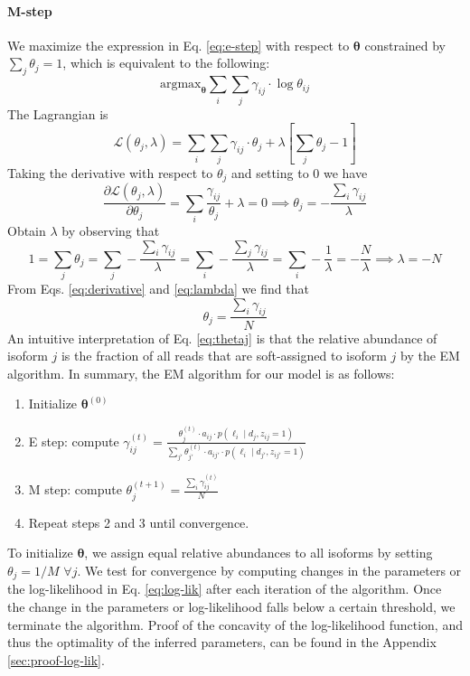 \paragraph{M-step} We maximize the expression in Eq. \ref{eq:e-step} with respect to $\bm\theta$ constrained by $\sum_j\theta_j=1$, which is equivalent to the following:
\begin{equation}
    \mathrm{argmax}_{\bm\theta}\sum_i\sum_j\gamma_{ij}\cdot\log\theta_{ij}
\end{equation}
The Lagrangian is
\begin{equation}
    \mathcal{L}(\theta_j,\lambda)=\sum_i\sum_j\gamma_{ij}\cdot\theta_j + \lambda\left[\sum_j\theta_j-1\right]
\end{equation}
Taking the derivative with respect to $\theta_j$ and setting to $0$ we have
\begin{equation}
    \frac{\partial\mathcal{L}(\theta_j,\lambda)}{\partial\theta_j}=\sum_i\frac{\gamma_{ij}}{\theta_j}+\lambda=0\implies\theta_j=-\frac{\sum_i\gamma_{ij}}{\lambda}\label{eq:derivative}
\end{equation}
Obtain $\lambda$ by observing that
\begin{equation}
    1=\sum_j\theta_j=\sum_j-\frac{\sum_i\gamma_{ij}}{\lambda}=\sum_i-\frac{\sum_j\gamma_{ij}}{\lambda}=\sum_i-\frac{1}{\lambda}=-\frac{N}{\lambda}\implies\lambda=-N\label{eq:lambda}
\end{equation}
From Eqs. \ref{eq:derivative} and \ref{eq:lambda} we find that
\begin{equation}
    \theta_j=\frac{\sum_i\gamma_{ij}}{N}\label{eq:thetaj}
\end{equation}
An intuitive interpretation of Eq. \ref{eq:thetaj} is that the relative abundance of isoform $j$ is the fraction of all reads that are soft-assigned to isoform $j$ by the EM algorithm. In summary, the EM algorithm for our model is as follows:
\begin{enumerate}
    \item Initialize $\bm{\theta}^{(0)}$
    \item E step: compute $\gamma_{ij}^{(t)}=\frac{\theta_j^{(t)}\cdot a_{ij}\cdot p(\ell_i\mid d_j, z_{ij}=1)}{\sum_{j'}\theta_{j'}^{(t)}\cdot a_{ij'}\cdot p(\ell_i\mid d_{j'}, z_{ij'}=1)}$
    \item M step: compute $\theta_j^{(t+1)}=\frac{\sum_i\gamma_{ij}^{(t)}}{N}$
    \item Repeat steps 2 and 3 until convergence.
\end{enumerate}
To initialize $\bm\theta$, we assign equal relative abundances to all isoforms by setting $\theta_j=1/M$ $\forall j$. We test for convergence by computing changes in the parameters or the log-likelihood in Eq. \ref{eq:log-lik} after each iteration of the algorithm. Once the change in the  parameters or log-likelihood falls below a certain threshold, we terminate the algorithm. Proof of the concavity of the log-likelihood function, and thus the optimality of the inferred parameters, can be found in the Appendix \ref{sec:proof-log-lik}. 

